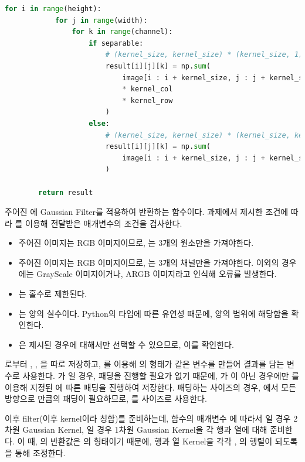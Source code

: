 \documentclass{report}
\begin{document}
\begin{lstlisting}[language=Python, caption=filterGaussian, firstnumber=7]
        for i in range(height):
            for j in range(width):
                for k in range(channel):
                    if separable:
                        # (kernel_size, kernel_size) * (kernel_size, 1) * (1, kernel_size)
                        result[i][j][k] = np.sum(
                            image[i : i + kernel_size, j : j + kernel_size, k]
                            * kernel_col
                            * kernel_row
                        )
                    else:
                        # (kernel_size, kernel_size) * (kernel_size, kernel_size)
                        result[i][j][k] = np.sum(
                            image[i : i + kernel_size, j : j + kernel_size, k] * kernel
                        )
    
        return result
\end{lstlisting}

주어진 에 Gaussian Filter를 적용하여 반환하는 함수이다.
과제에서 제시한 조건에 따라 를 이용해 전달받은 매개변수의 조건을 검사한다.

\begin{itemize}
    \item 주어진 이미지는 RGB 이미지이므로, 는 3개의 원소만을 가져야한다.
    \item 주어진 이미지는 RGB 이미지이므로, 는 3개의 채널만을 가져야한다. 이외의 경우에는 GrayScale 이미지이거나, ARGB 이미지라고 인식해 오류를 발생한다.
    \item {}는 홀수로 제한된다.
    \item {}는 양의 실수이다. Python의 타입에 따른 유연성 때문에, 양의 범위에 해당함을 확인한다.
    \item {}은 제시된 경우에 대해서만 선택할 수 있으므로, 이를 확인한다.
\end{itemize}

로부터 , , 을 따로 저장하고, 를 이용해 의 형태가 같은 변수를 만들어 결과를 담는 변수로 사용한다.
가 일 경우, 패딩을 진행할 필요가 없기 때문에, 가 이 아닌 경우에만 를 이용해 지정된 에 따른 패딩을 진행하여 저장한다.
패딩하는 사이즈의 경우, 에서 모든 방향으로 만큼의 패딩이 필요하므로, 를 사이즈로 사용한다.

이후 filter(이후 kernel이라 칭함)를 준비하는데, 함수의 매개변수 에 따라서 일 경우 2차원 Gaussian Kernel, 일 경우 1차원 Gaussian Kernel을 각 행과 열에 대해 준비한다.
이 때, 의 반환값은 의 형태이기 때문에, 행과 열 Kernel을 각각 , 의 행렬이 되도록 을 통해 조정한다.
\end{document}
